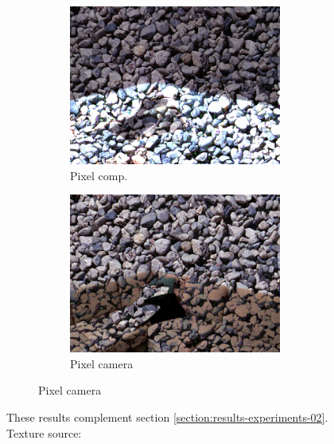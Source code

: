 \begin{figure}[]
\begin{subfigure}{\textwidth}
\begin{subfigure}{0.24\textwidth}
            \includegraphics[width=\textwidth]{images/04-experiment02/sofa/pebbles/pixel_im.jpg}
            \caption*{Pixel comp.}
        \end{subfigure}
        \hfill
        \begin{subfigure}{0.24\textwidth}
            \centering
            \includegraphics[width=\textwidth]{images/04-experiment02/sofa/pebbles/pixel_proj.jpg}
            \caption*{Pixel camera}
        \end{subfigure}
    \end{subfigure}
    \caption{These results complement section \ref{section:results-experiments-02}. Texture source: \citet{Pixar128}}
    \label{fig:ex02-complete-sofa-marble_wood_pebbles}
\end{figure}

